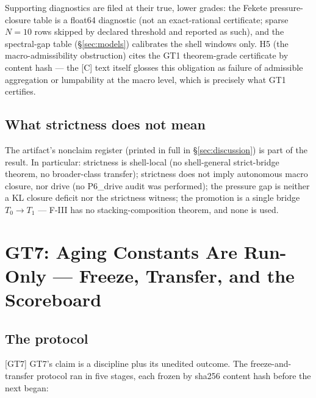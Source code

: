 \documentclass[11pt]{article}
\newcommand{\claimref}[2]{[#1]}
\theoremstyle{definition}
\begin{document}
Supporting diagnostics are filed at their true, lower grades: the Fekete pressure-closure table is
a float64 diagnostic (not an exact-rational certificate; sparse $N=10$ rows skipped by declared
threshold and reported as such), and the spectral-gap table (\S\ref{sec:models}) calibrates the
shell windows only. H5 (the macro-admissibility obstruction) cites the GT1 theorem-grade
certificate by content hash --- the [C] text itself glosses this obligation as failure of
admissible aggregation or lumpability at the macro level, which is precisely what GT1 certifies.

\subsection{What strictness does not mean}

The artifact's nonclaim register (printed in full in \S\ref{sec:discussion}) is part of the
result. In particular: strictness is shell-local (no shell-general strict-bridge theorem, no
broader-class transfer); strictness does not imply autonomous macro closure, nor drive (no
P6\_drive audit was performed); the pressure gap is neither a KL closure deficit nor the
strictness witness; the promotion is a single bridge $T_0 \to T_1$ --- F-III has no
stacking-composition theorem, and none is used.
 \section{GT7: Aging Constants Are Run-Only --- Freeze, Transfer, and the Scoreboard}
\label{sec:gt7}


\subsection{The protocol}

\claimref{GT7}{4905b013624462549b9a4cdb18f51d0220f70be29976be461e5a8681978dcab8}
GT7's claim is a discipline plus its unedited outcome. The freeze-and-transfer protocol ran in
five stages, each frozen by sha256 content hash before the next began:
\end{document}
